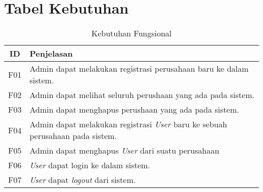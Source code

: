 \chapter{Tabel Kebutuhan}

\bgroup
\begin{table}[ht]
  \def\arraystretch{1.5}
  \caption{Kebutuhan Fungsional}
  \label{tab:kebutuhan-fungsional}
  \centering
  \begin{tabular}{|c|p{12cm}|}
    \hline
    ID  & Penjelasan                                                                                                      \\
    \hline
    F01 & Admin dapat melakukan registrasi perusahaan baru ke dalam sistem.                                               \\
    \hline
    F02 & Admin dapat melihat seluruh perushaan yang ada pada sistem.                                                     \\
    \hline
    F03 & Admin dapat menghapus perushaan yang ada pada sistem.                                                           \\
    \hline
    F04 & Admin dapat melakukan registrasi \textit{User} baru ke sebuah perusahaan pada sistem.
    \\
    \hline
    F05 & Admin dapat menghapus \textit{User} dari suatu perusahaan
    \\
    \hline
    F06 & \textit{User} dapat login ke dalam sistem.
    \\
    \hline
    F07 & \textit{User} dapat \textit{logout} dari sistem.


\end{tabular}
\end{table}
